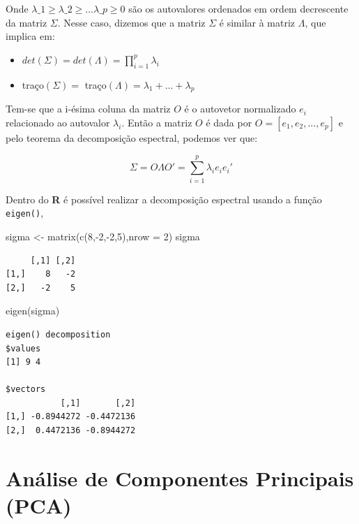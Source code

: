 \documentclass[
  letterpaper,
  DIV=11,
  numbers=noendperiod]{scrreprt}
\newenvironment{Shaded}{\begin{snugshade}}{\end{snugshade}}
\newcommand{\AttributeTok}[1]{\textcolor[rgb]{0.40,0.45,0.13}{#1}}
\newcommand{\DecValTok}[1]{\textcolor[rgb]{0.68,0.00,0.00}{#1}}
\newcommand{\FunctionTok}[1]{\textcolor[rgb]{0.28,0.35,0.67}{#1}}
\newcommand{\NormalTok}[1]{\textcolor[rgb]{0.00,0.23,0.31}{#1}}
\newcommand{\OtherTok}[1]{\textcolor[rgb]{0.00,0.23,0.31}{#1}}
\newcommand{\SpecialCharTok}[1]{\textcolor[rgb]{0.37,0.37,0.37}{#1}}
\begin{document}
Onde \(\lambda\_1 \geq \lambda\_2 \geq \dots \lambda\_p\geq0\) são os
autovalores ordenados em ordem decrescente da matriz \(\Sigma\). Nesse
caso, dizemos que a matriz \(\Sigma\) é similar à matriz \(\Lambda\),
que implica em:

\begin{itemize}
\item
  \(det(\Sigma) = det(\Lambda) = \prod^p_{i=1} \lambda_i\)
\item
  traço\((\Sigma) =\) traço\((\Lambda) = \lambda_1 +\dots+\lambda_p\)
\end{itemize}

Tem-se que a i-ésima coluna da matriz \(O\) é o autovetor normalizado
\(e_i\) relacionado ao autovalor \(\lambda_i\). Então a matriz \(O\) é
dada por \(O = [e_1,e_2,\dots,e_p]\) e pelo teorema da decomposição
espectral, podemos ver que:

\[
\Sigma = O \Lambda O' = \sum_{i=1}^p \lambda_i e_i e_i'
\]

Dentro do \textbf{R} é possível realizar a decomposição espectral usando
a função \texttt{eigen()},

\begin{Shaded}
\begin{Highlighting}[]
\NormalTok{sigma }\OtherTok{\textless{}{-}} \FunctionTok{matrix}\NormalTok{(}\FunctionTok{c}\NormalTok{(}\DecValTok{8}\NormalTok{,}\SpecialCharTok{{-}}\DecValTok{2}\NormalTok{,}\SpecialCharTok{{-}}\DecValTok{2}\NormalTok{,}\DecValTok{5}\NormalTok{),}\AttributeTok{nrow =} \DecValTok{2}\NormalTok{)}
\NormalTok{sigma}
\end{Highlighting}
\end{Shaded}

\begin{verbatim}
     [,1] [,2]
[1,]    8   -2
[2,]   -2    5
\end{verbatim}

\begin{Shaded}
\begin{Highlighting}[]
\FunctionTok{eigen}\NormalTok{(sigma)}
\end{Highlighting}
\end{Shaded}

\begin{verbatim}
eigen() decomposition
$values
[1] 9 4

$vectors
           [,1]       [,2]
[1,] -0.8944272 -0.4472136
[2,]  0.4472136 -0.8944272
\end{verbatim}

\hypertarget{anuxe1lise-de-componentes-principais-pca}{%
\section{Análise de Componentes Principais
(PCA)}\label{anuxe1lise-de-componentes-principais-pca}}
\end{document}
